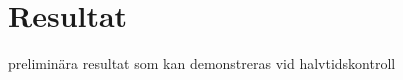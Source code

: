 \chapter{Resultat}\label{cha:metod}

preliminära resultat som kan demonstreras vid halvtidskontroll
